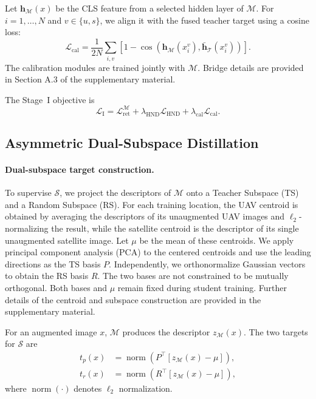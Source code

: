 Let $\mathbf{h}_{\mathcal{M}}(x)$ be the CLS feature from
a selected hidden layer of $\mathcal{M}$. For
$i=1,\ldots,N$ and $v\in\{u,s\}$, we align it with
the fused teacher target using a cosine loss:
\begin{equation}
\mathcal{L}_{\mathrm{cal}}
=\frac{1}{2N}\sum_{i,v}
\left[
1-\cos\left(
\mathbf{h}_{\mathcal{M}}(x_i^v),
\bar{\mathbf{h}}_{\mathcal{T}}(x_i^v)
\right)
\right].
\label{eq:calibration_loss}
\end{equation}
The calibration modules are trained jointly with $\mathcal{M}$.
Bridge details are provided in Section A.3 of the supplementary material.

The Stage~I objective is
\begin{equation}
\mathcal{L}_{\mathrm{I}}
=\mathcal{L}_{\mathrm{ret}}^{\mathcal{M}}
+\lambda_{\mathrm{HND}}\mathcal{L}_{\mathrm{HND}}
+\lambda_{\mathrm{cal}}\mathcal{L}_{\mathrm{cal}}.
\label{eq:stage_one_objective}
\end{equation}


\subsection{Asymmetric Dual-Subspace Distillation}
\label{sec:adsd}
\paragraph{Dual-subspace target construction.}
To supervise $\mathcal{S}$, we project the descriptors of
$\mathcal{M}$ onto a Teacher Subspace (TS) and a Random
Subspace (RS). For each training location, the UAV centroid is obtained
by averaging the descriptors of its unaugmented UAV images
and $\ell_2$-normalizing the result, while the satellite
centroid is the descriptor of its single unaugmented
satellite image. Let $\mu$ be the mean of
these centroids.
We apply principal component analysis (PCA) to the
centered centroids and use the leading directions as the
TS basis $P$. Independently, we orthonormalize Gaussian
vectors to obtain the RS basis $R$. The two bases are not
constrained to be mutually orthogonal. Both bases and
$\mu$ remain fixed during student training. 
Further details of the centroid and subspace construction
are provided in the supplementary material.

For an augmented image $x$, $\mathcal{M}$ produces the
descriptor $z_{\mathcal{M}}(x)$. The two targets for
$\mathcal{S}$ are
\begin{equation}
\begin{aligned}
t_p(x)&=\operatorname{norm}\!\left(
P^\top[z_{\mathcal{M}}(x)-\mu]\right),\\
t_r(x)&=\operatorname{norm}\!\left(
R^\top[z_{\mathcal{M}}(x)-\mu]\right),
\end{aligned}
\label{eq:adsd_targets}
\end{equation}
where $\operatorname{norm}(\cdot)$ denotes
$\ell_2$ normalization.

